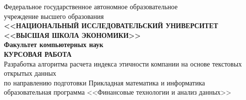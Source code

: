 \documentclass[a4paper, 14pt]{extarticle}
\begin{document}
    \begin{center}
      \hfill \break 
      \small{Федеральное государственное автономное образовательное\\ учреждение высшего образования}\\ 
        \vspace{0.5ex}
      \textbf{\small{<<НАЦИОНАЛЬНЫЙ ИССЛЕДОВАТЕЛЬСКИЙ УНИВЕРСИТЕТ\\ <<ВЫСШАЯ ШКОЛА ЭКОНОМИКИ>>}}\\
        \vspace{0.5ex}
      \small{\textbf{Факультет компьютерных наук}}\\
        \vspace{13ex}
      \textbf{\normalsize{КУРСОВАЯ РАБОТА}}\\
      \hfill \break
      \normalsize{Разработка алгоритма расчета индекса этичности компании на основе текстовых открытых данных }\\
      \hfill \break
      \small{по направлению подготовки Прикладная математика и информатика\\ образовательная программа <<Финансовые технологии и анализ данных>>}\\
    \end{center}
    
    \vspace{9ex}
    
\end{document}
